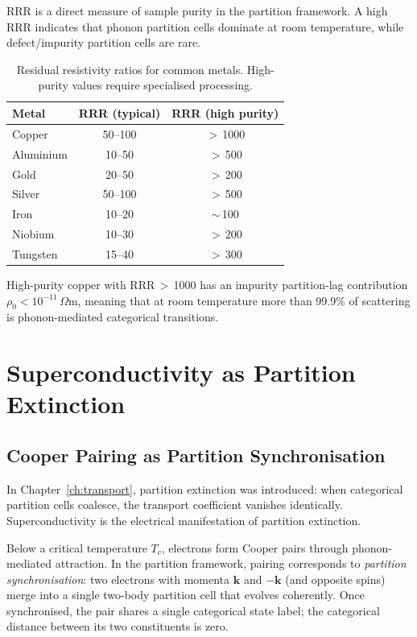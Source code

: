 RRR is a direct measure of sample purity in the partition framework.
A high RRR indicates that phonon partition cells dominate at room
temperature, while defect/impurity partition cells are rare.

\begin{table}[htbp]
  \centering
  \caption{Residual resistivity ratios for common metals.
    High-purity values require specialised processing.}
  \label{tab:ch18-rrr}
  \begin{tabular}{lcc}
    \toprule
    Metal & RRR (typical) & RRR (high purity) \\
    \midrule
    Copper    & 50--100  & $>$\,1000 \\
    Aluminium & 10--50   & $>$\,500 \\
    Gold      & 20--50   & $>$\,200 \\
    Silver    & 50--100  & $>$\,500 \\
    Iron      & 10--20   & $\sim$\,100 \\
    Niobium   & 10--30   & $>$\,200 \\
    Tungsten  & 15--40   & $>$\,300 \\
    \bottomrule
  \end{tabular}
\end{table}

High-purity copper with RRR\,$>$\,1000 has an impurity partition-lag
contribution $\rho_0 < 10^{-11}$\,$\Omega$m, meaning that at room
temperature more than 99.9\% of scattering is phonon-mediated categorical
transitions.

\section{Superconductivity as Partition Extinction}
\label{sec:ch18-superconductivity}

\subsection{Cooper Pairing as Partition Synchronisation}

In Chapter~\ref{ch:transport}, partition extinction was introduced: when
categorical partition cells coalesce, the transport coefficient vanishes
identically.  Superconductivity is the electrical manifestation of
partition extinction.

Below a critical temperature $T_c$, electrons form Cooper pairs through
phonon-mediated attraction.  In the partition framework, pairing
corresponds to \emph{partition synchronisation}: two electrons with
momenta $\mathbf{k}$ and $-\mathbf{k}$ (and opposite spins) merge into a
single two-body partition cell that evolves coherently.  Once synchronised,
the pair shares a single categorical state label; the categorical distance
between its two constituents is zero.

